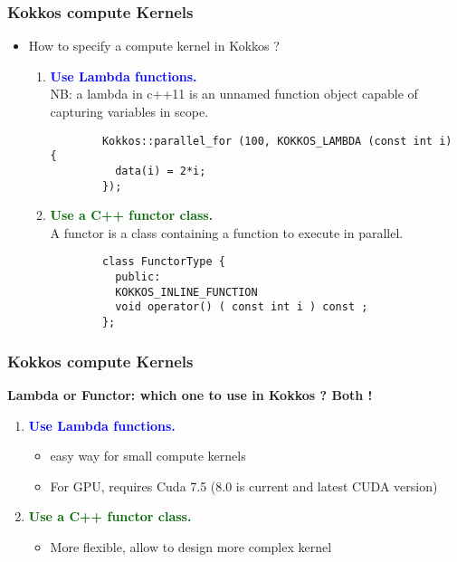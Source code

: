 \begin{frame}[fragile=singleslide]
  \frametitle{Kokkos compute Kernels}

  \begin{itemize}
  \item How to specify a compute kernel in Kokkos ?
    \begin{enumerate}
    \item \textcolor{blue}{\textbf{Use Lambda functions.}}\\
      NB: a lambda in c++11 is an unnamed function object capable of capturing variables in scope.
      \begin{verbatim}
        Kokkos::parallel_for (100, KOKKOS_LAMBDA (const int i) {
          data(i) = 2*i;
        });
      \end{verbatim}
    \item \textcolor{darkgreen}{\textbf{Use a C++ functor class.}}\\
      A functor is a class containing a function to execute in parallel.
      \begin{verbatim}
        class FunctorType {
          public:
          KOKKOS_INLINE_FUNCTION
          void operator() ( const int i ) const ;
        };
      \end{verbatim}
    \end{enumerate}
  \end{itemize}

\end{frame}


\begin{frame}[fragile=singleslide]
  \frametitle{Kokkos compute Kernels}

  \textbf{Lambda or Functor: which one to use in Kokkos ? Both !}
  \begin{enumerate}
  \item \textcolor{blue}{\textbf{Use Lambda functions.}}\\
    \begin{itemize}
    \item easy way for small compute kernels
    \item For GPU, requires Cuda 7.5 (8.0 is current and latest CUDA version)
    \end{itemize}
  \item \textcolor{darkgreen}{\textbf{Use a C++ functor class.}}\\
    \begin{itemize}
    \item More flexible, allow to design more complex kernel
    \end{itemize}
  \end{enumerate}
\end{frame}

